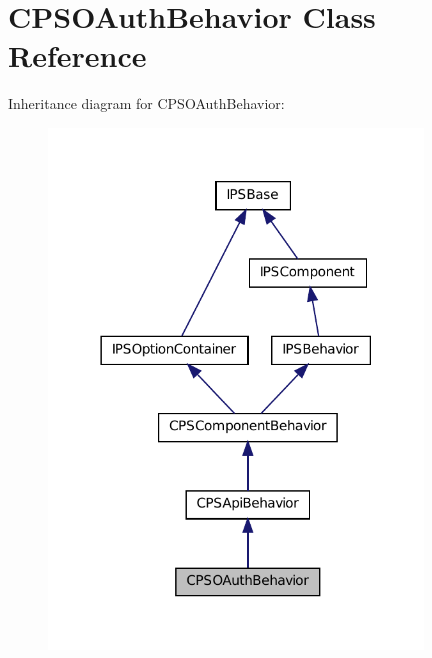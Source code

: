 \hypertarget{classCPSOAuthBehavior}{
\section{CPSOAuthBehavior Class Reference}
\label{classCPSOAuthBehavior}
}


Inheritance diagram for CPSOAuthBehavior:\nopagebreak
\begin{figure}[H]
\begin{center}
\leavevmode
\includegraphics[width=282pt]{classCPSOAuthBehavior__inherit__graph}
\end{center}
\end{figure}


